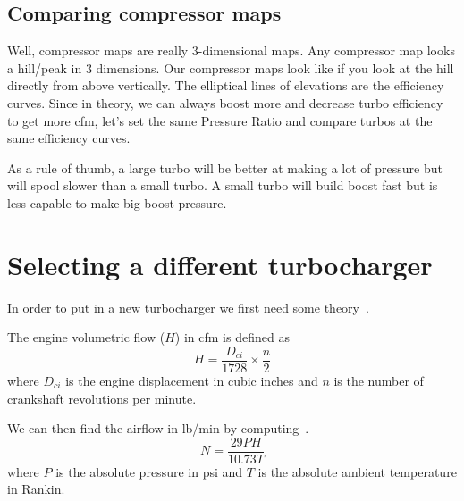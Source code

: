 \documentclass[11pt,a4paper]{book}
\begin{document}
\subsection{Comparing compressor maps}
Well, compressor maps are really 3-dimensional maps. Any compressor map looks a hill/peak in 3
dimensions. Our compressor maps look like if you look at the hill directly from above vertically. The
elliptical lines of elevations are the efficiency curves. Since in theory, we can always boost more and
decrease turbo efficiency to get more cfm, let’s set the same Pressure Ratio and compare turbos at
the same efficiency curves.

As a rule of thumb, a large turbo will be better at making a lot of pressure but will spool slower than a
small turbo. A small turbo will build boost fast but is less capable to make big boost pressure.

\section{Selecting a different turbocharger}
In order to put in a new turbocharger we first need some
theory~\cite{isaac-lowry_turbo_2004}.
\begin{definition}
    The engine volumetric
    flow ($H$) in cfm is defined as
    \begin{equation}
        H=\frac{D_{ci}}{1728}\times\frac{n}{2}
        \label{eqn:volumetric-flow}
    \end{equation}
    where $D_{ci}$ is the engine displacement in cubic inches and $n$ is the number
    of crankshaft revolutions per minute.
    \label{}
\end{definition}
We can then find the airflow in lb/min by computing~\cite{isaac-lowry_turbo_2004}.
\begin{equation}
    N=\frac{29PH}{10.73T}
    \label{eqn:airflow}
\end{equation}
where $P$ is the absolute pressure in psi and $T$ is the absolute ambient
temperature in Rankin.
\end{document}
